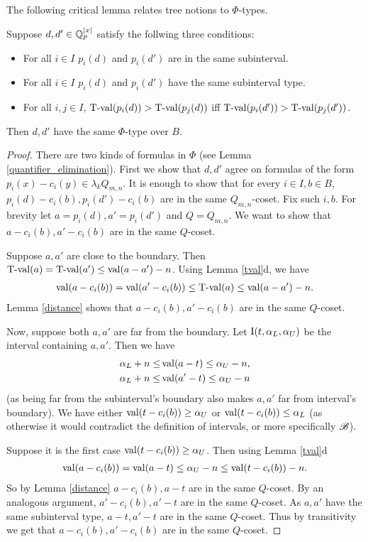 The following critical lemma relates tree notions to $\Phi$-types.
\begin{Lemma} \label{main_lemma}
  Suppose $d, d' \in \mathbb{Q}_p^{|x|}$ satisfy the follwing three conditions:
  \begin{itemize}
  \item For all $i \in I$ $p_i(d)$ and $p_i(d')$ are in the same subinterval.
  \item For all $i \in I$ $p_i(d)$ and $p_i(d')$ have the same subinterval type.
  \item For all $i,j \in I$, $\operatorname{T-val}(p_i(d)) > \operatorname{T-val}(p_j(d))$ iff $\operatorname{T-val}(p_i(d')) > \operatorname{T-val}(p_j(d'))$.
  \end{itemize}
  Then $d, d'$ have the same $\Phi$-type over $B$.
\end{Lemma}
\begin{proof}
  There are two kinds of formulas in $\Phi$
  (see Lemma \ref{quantifier_elimination}).
  First we show that $d, d'$ agree on formulas of the form $p_i(x) - c_i(y) \in \lambda_k Q_{m,n}$.
  It is enough to show that for every $i \in I, b \in B$, $p_i(d) - c_i(b), p_i(d') - c_i(b)$ are in the same $Q_{m,n}$-coset.
  Fix such $i, b$.
  For brevity let $a = p_i(d), a' = p_i(d')$ and $Q = Q_{m,n}$.
  We want to show that $a - c_i(b), a' - c_i(b)$ are in the same $Q$-coset.
  
  Suppose $a, a'$ are close to the boundary.
  Then $\operatorname{T-val}(a) = \operatorname{T-val}(a') \leq \operatorname{val}(a - a') - n$.
  Using Lemma \ref{tval}d, we have
  \begin{align*}
    \operatorname{val}(a - c_i(b)) = \operatorname{val}(a' - c_i(b)) \leq \operatorname{T-val}(a) \leq \operatorname{val}(a - a') - n.
  \end{align*}
  Lemma \ref{distance} shows that $a - c_i(b), a' - c_i(b)$ are in the same $Q$-coset.
  
  Now, suppose both $a, a'$ are far from the boundary.
  Let $\operatorname{I}(t, \alpha_L, \alpha_U)$ be the interval containing $a, a'$.
  Then we have 
  \begin{align*}
    \alpha_L + n \leq &\operatorname{val} (a - t) \leq \alpha_U - n, \\
    \alpha_L + n \leq &\operatorname{val} (a' - t) \leq \alpha_U - n
  \end{align*}
  (as being far from the subinterval's boundary also makes $a,a'$ far from interval's boundary).
  We have either $\operatorname{val}(t - c_i(b)) \geq \alpha_U$ or $\operatorname{val}(t - c_i(b)) \leq \alpha_L$ (as otherwise it would contradict the definition of intervals, or more specifically $\mathscr B$).
  
  Suppose it is the first case $\operatorname{val}(t - c_i(b)) \geq \alpha_U$.
  Then using Lemma \ref{tval}d
  \begin{align*}
    \operatorname{val}(a - c_i(b)) = \operatorname{val}(a - t) \leq \alpha_U - n \leq \operatorname{val}(t - c_i(b)) - n.
  \end{align*}
  So by Lemma \ref{distance} $a - c_i(b), a - t$ are in the same $Q$-coset.
  By an analogous argument, $a' - c_i(b), a' - t$ are in the same $Q$-coset.
  As $a, a'$ have the same subinterval type, $a - t, a' - t$ are in the same $Q$-coset.
  Thus by transitivity we get that $a - c_i(b), a' - c_i(b)$ are in the same $Q$-coset.
  

\end{proof}

